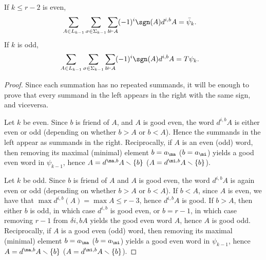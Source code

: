 \begin{lemma} \label{lemma:pair}
	If $k\leq r-2$ is even,
	\begin{align*}
		\sum_{A\in L_{k-1}}\sum_{\sigma\in \Sigma_{k-1}}\sum_{b\vdash A}(-1)^i\sgn(A)d^{i,b}A &= \bar{\psi}_k.
	\end{align*}
	If $k$ is odd,
	\begin{align*}
		\sum_{A\in L_{k-1}}\sum_{\sigma\in \Sigma_{k-1}}\sum_{b\vdash A}(-1)^i\sgn(A)d^{i,b}A &= T\psi_k.
	\end{align*}
\end{lemma}

\begin{proof}
	Since each summation has no repeated summands, it will be enough to prove that every summand in the left appears in the right with the same sign, and viceversa.


	Let $k$ be even. Since $b$ is friend of $A$, and $A$ is good even, the word $d^{i,b}A$ is either even or odd (depending on whether $b>A$ or $b<A$). Hence the summands in the left appear as summands in the right. Reciprocally, if $A$ is an even (odd) word, then removing its maximal (minimal) element $b=a_{\ma}$ ($b=a_{\mi}$) yields a good even word in $\psi_{k-1}$, hence $A = d^{\ma,b}A\smallsetminus\{b\}$ ($A = d^{\mi,b}A\smallsetminus\{b\}$).

	Let $k$ be odd. Since $b$ is friend of $A$ and $A$ is good even, the word $d^{i,b}A$ is again even or odd (depending on whether $b>A$ or $b<A$). If $b<A$, since $A$ is even, we have that $\max d^{i,b}(A) = \max A \leq r-3$, hence $d^{i,b}A$ is good. If $b>A$, then either $b$ is odd, in which case $d^{i,b}$ is good even, or $b=r-1$, in which case removing $r-1$ from $\delta{i,b}A$ yields the good even word $A$, hence $A$ is good odd. Reciprocally, if $A$ is a good even (odd) word, then removing its maximal (minimal) element $b=a_{\ma}$ ($b=a_{\mi}$) yields a good even word in $\psi_{k-1}$, hence $A = d^{\ma,b}A\smallsetminus\{b\}$ ($A = d^{\mi,b}A\smallsetminus\{b\}$).



\end{proof}
